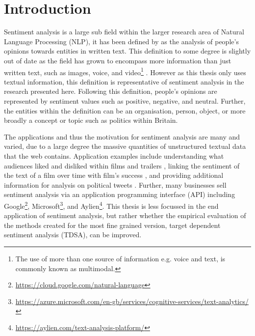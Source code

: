 \section{Introduction}
Sentiment analysis is a large sub field within the larger research area of Natural Language Processing (NLP), it has been defined by \citet{liu2015sentiment} as the analysis of people's opinions towards entities in written text. This definition to some degree is slightly out of date as the field has grown to encompass more information than just written text, such as images, voice, and video\footnote{The use of more than one source of information e.g. voice and text, is commonly known as multimodal.} \citep{poria2016fusing}. However as this thesis only uses textual information, this definition is representative of sentiment analysis in the research presented here. Following this definition, people's opinions are represented by sentiment values such as positive, negative, and neutral. Further, the entities within the definition can be an organisation, person, object, or more broadly a concept or topic such as politics within Britain. 


The applications and thus the motivation for sentiment analysis are many and varied, due to a large degree the massive quantities of unstructured textual data that the web contains. Application examples include understanding what audiences liked and disliked within films and trailers \citep{pereg-etal-2019-absapp}, linking the sentiment of the text of a film over time with film's success \citep{Vecchio2018TheDS}, and providing additional information for analysis on political tweets \citep{wang-etal-2017-totemss}. Further, many businesses sell sentiment analysis via an application programming interface (API) including Google\footnote{\url{https://cloud.google.com/natural-language}}, Microsoft\footnote{\url{https://azure.microsoft.com/en-gb/services/cognitive-services/text-analytics/}}, and Aylien\footnote{\url{https://aylien.com/text-analysis-platform/}}. This thesis is less focussed in the end application of sentiment analysis, but rather whether the empirical evaluation of the methods created for the most fine grained version, target dependent sentiment analysis (TDSA), can be improved.

